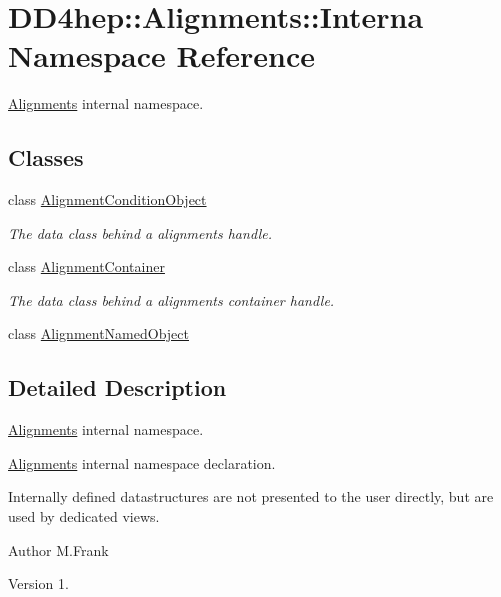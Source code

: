 \hypertarget{namespace_d_d4hep_1_1_alignments_1_1_interna}{}\section{D\+D4hep\+:\+:Alignments\+:\+:Interna Namespace Reference}
\label{namespace_d_d4hep_1_1_alignments_1_1_interna}


\hyperlink{namespace_d_d4hep_1_1_alignments}{Alignments} internal namespace.  


\subsection*{Classes}
\begin{DoxyCompactItemize}
\item 
class \hyperlink{class_d_d4hep_1_1_alignments_1_1_interna_1_1_alignment_condition_object}{Alignment\+Condition\+Object}
\begin{DoxyCompactList}\small\item\em The data class behind a alignments handle. \end{DoxyCompactList}\item 
class \hyperlink{class_d_d4hep_1_1_alignments_1_1_interna_1_1_alignment_container}{Alignment\+Container}
\begin{DoxyCompactList}\small\item\em The data class behind a alignments container handle. \end{DoxyCompactList}\item 
class \hyperlink{class_d_d4hep_1_1_alignments_1_1_interna_1_1_alignment_named_object}{Alignment\+Named\+Object}
\end{DoxyCompactItemize}


\subsection{Detailed Description}
\hyperlink{namespace_d_d4hep_1_1_alignments}{Alignments} internal namespace. 

\hyperlink{namespace_d_d4hep_1_1_alignments}{Alignments} internal namespace declaration.

Internally defined datastructures are not presented to the user directly, but are used by dedicated views.

\begin{DoxyAuthor}{Author}
M.\+Frank 
\end{DoxyAuthor}
\begin{DoxyVersion}{Version}
1. 
\end{DoxyVersion}
